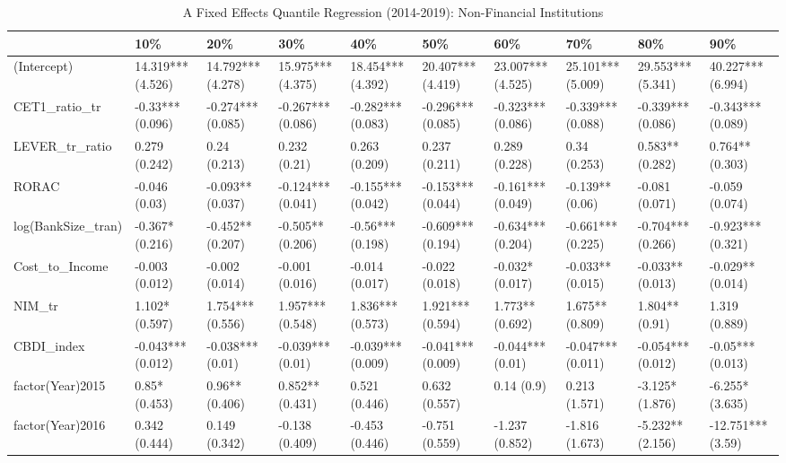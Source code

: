 \begin{table}[ht]
\centering
\caption{A Fixed Effects Quantile Regression (2014-2019): Non-Financial Institutions} 
\begingroup\small
\begin{tabular}{llllllllll}
  \toprule
 & 10\% & 20\% & 30\% & 40\% & 50\% & 60\% & 70\% & 80\% & 90\% \\ 
  \midrule
(Intercept) & 14.319*** (4.526) & 14.792*** (4.278) & 15.975*** (4.375) & 18.454*** (4.392) & 20.407*** (4.419) & 23.007*** (4.525) & 25.101*** (5.009) & 29.553*** (5.341) & 40.227*** (6.994) \\ 
  CET1\_ratio\_tr & -0.33*** (0.096) & -0.274*** (0.085) & -0.267*** (0.086) & -0.282*** (0.083) & -0.296*** (0.085) & -0.323*** (0.086) & -0.339*** (0.088) & -0.339*** (0.086) & -0.343*** (0.089) \\ 
  LEVER\_tr\_ratio & 0.279 (0.242) & 0.24 (0.213) & 0.232 (0.21) & 0.263 (0.209) & 0.237 (0.211) & 0.289 (0.228) & 0.34 (0.253) & 0.583** (0.282) & 0.764** (0.303) \\ 
  RORAC & -0.046 (0.03) & -0.093** (0.037) & -0.124*** (0.041) & -0.155*** (0.042) & -0.153*** (0.044) & -0.161*** (0.049) & -0.139** (0.06) & -0.081 (0.071) & -0.059 (0.074) \\ 
  log(BankSize\_tran) & -0.367* (0.216) & -0.452** (0.207) & -0.505** (0.206) & -0.56*** (0.198) & -0.609*** (0.194) & -0.634*** (0.204) & -0.661*** (0.225) & -0.704*** (0.266) & -0.923*** (0.321) \\ 
  Cost\_to\_Income & -0.003 (0.012) & -0.002 (0.014) & -0.001 (0.016) & -0.014 (0.017) & -0.022 (0.018) & -0.032* (0.017) & -0.033** (0.015) & -0.033** (0.013) & -0.029** (0.014) \\ 
  NIM\_tr & 1.102* (0.597) & 1.754*** (0.556) & 1.957*** (0.548) & 1.836*** (0.573) & 1.921*** (0.594) & 1.773** (0.692) & 1.675** (0.809) & 1.804** (0.91) & 1.319 (0.889) \\ 
  CBDI\_index & -0.043*** (0.012) & -0.038*** (0.01) & -0.039*** (0.01) & -0.039*** (0.009) & -0.041*** (0.009) & -0.044*** (0.01) & -0.047*** (0.011) & -0.054*** (0.012) & -0.05*** (0.013) \\ 
  factor(Year)2015 & 0.85* (0.453) & 0.96** (0.406) & 0.852** (0.431) & 0.521 (0.446) & 0.632 (0.557) & 0.14 (0.9) & 0.213 (1.571) & -3.125* (1.876) & -6.255* (3.635) \\ 
  factor(Year)2016 & 0.342 (0.444) & 0.149 (0.342) & -0.138 (0.409) & -0.453 (0.446) & -0.751 (0.559) & -1.237 (0.852) & -1.816 (1.673) & -5.232** (2.156) & -12.751*** (3.59) \\ 

\end{tabular}
\end{table}
